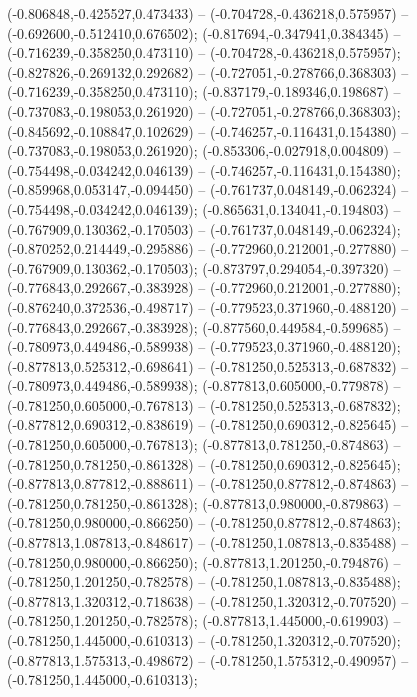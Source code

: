  (-0.806848,-0.425527,0.473433) -- (-0.704728,-0.436218,0.575957) -- (-0.692600,-0.512410,0.676502);
 (-0.817694,-0.347941,0.384345) -- (-0.716239,-0.358250,0.473110) -- (-0.704728,-0.436218,0.575957);
 (-0.827826,-0.269132,0.292682) -- (-0.727051,-0.278766,0.368303) -- (-0.716239,-0.358250,0.473110);
 (-0.837179,-0.189346,0.198687) -- (-0.737083,-0.198053,0.261920) -- (-0.727051,-0.278766,0.368303);
 (-0.845692,-0.108847,0.102629) -- (-0.746257,-0.116431,0.154380) -- (-0.737083,-0.198053,0.261920);
 (-0.853306,-0.027918,0.004809) -- (-0.754498,-0.034242,0.046139) -- (-0.746257,-0.116431,0.154380);
 (-0.859968,0.053147,-0.094450) -- (-0.761737,0.048149,-0.062324) -- (-0.754498,-0.034242,0.046139);
 (-0.865631,0.134041,-0.194803) -- (-0.767909,0.130362,-0.170503) -- (-0.761737,0.048149,-0.062324);
 (-0.870252,0.214449,-0.295886) -- (-0.772960,0.212001,-0.277880) -- (-0.767909,0.130362,-0.170503);
 (-0.873797,0.294054,-0.397320) -- (-0.776843,0.292667,-0.383928) -- (-0.772960,0.212001,-0.277880);
 (-0.876240,0.372536,-0.498717) -- (-0.779523,0.371960,-0.488120) -- (-0.776843,0.292667,-0.383928);
 (-0.877560,0.449584,-0.599685) -- (-0.780973,0.449486,-0.589938) -- (-0.779523,0.371960,-0.488120);
 (-0.877813,0.525312,-0.698641) -- (-0.781250,0.525313,-0.687832) -- (-0.780973,0.449486,-0.589938);
 (-0.877813,0.605000,-0.779878) -- (-0.781250,0.605000,-0.767813) -- (-0.781250,0.525313,-0.687832);
 (-0.877812,0.690312,-0.838619) -- (-0.781250,0.690312,-0.825645) -- (-0.781250,0.605000,-0.767813);
 (-0.877813,0.781250,-0.874863) -- (-0.781250,0.781250,-0.861328) -- (-0.781250,0.690312,-0.825645);
 (-0.877813,0.877812,-0.888611) -- (-0.781250,0.877812,-0.874863) -- (-0.781250,0.781250,-0.861328);
 (-0.877813,0.980000,-0.879863) -- (-0.781250,0.980000,-0.866250) -- (-0.781250,0.877812,-0.874863);
 (-0.877813,1.087813,-0.848617) -- (-0.781250,1.087813,-0.835488) -- (-0.781250,0.980000,-0.866250);
 (-0.877813,1.201250,-0.794876) -- (-0.781250,1.201250,-0.782578) -- (-0.781250,1.087813,-0.835488);
 (-0.877813,1.320312,-0.718638) -- (-0.781250,1.320312,-0.707520) -- (-0.781250,1.201250,-0.782578);
 (-0.877813,1.445000,-0.619903) -- (-0.781250,1.445000,-0.610313) -- (-0.781250,1.320312,-0.707520);
 (-0.877813,1.575313,-0.498672) -- (-0.781250,1.575312,-0.490957) -- (-0.781250,1.445000,-0.610313);
